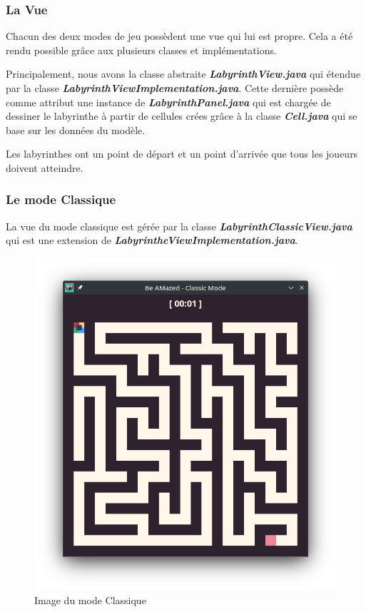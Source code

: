 \subsubsection{La Vue}
\label{subsubsec:vue}

Chacun des deux modes de jeu possèdent une vue qui lui est propre.
Cela a été rendu possible grâce aux plusieurs classes et implémentations.

Principalement, nous avons la classe abstraite \textbf{\textit{LabyrinthView.java}} qui étendue par la classe \textbf{\textit{LabyrinthViewImplementation.java}}.
Cette dernière possède comme attribut une instance de
\textbf{\textit{LabyrinthPanel.java}} qui est chargée de dessiner le labyrinthe à partir de cellules crées grâce à la classe \textbf{\textit{Cell.java}} qui se base sur les données du modèle.

Les labyrinthes ont un point de départ et un point d'arrivée que tous les joueurs doivent atteindre.

\newpage

\subsubsection*{Le mode Classique}

La vue du mode classique est gérée par la classe \textbf{\textit{LabyrinthClassicView.java}} qui est une extension de \textbf{\textit{LabyrintheViewImplementation.java}}.

\begin{figure}[!htb]%
    \centering
    \includegraphics[scale=0.3]{ressources/Implementation/Labyrinthe/Vue/Classic/Classic.png}%
    \caption{Image du mode Classique}%
\end{figure}

